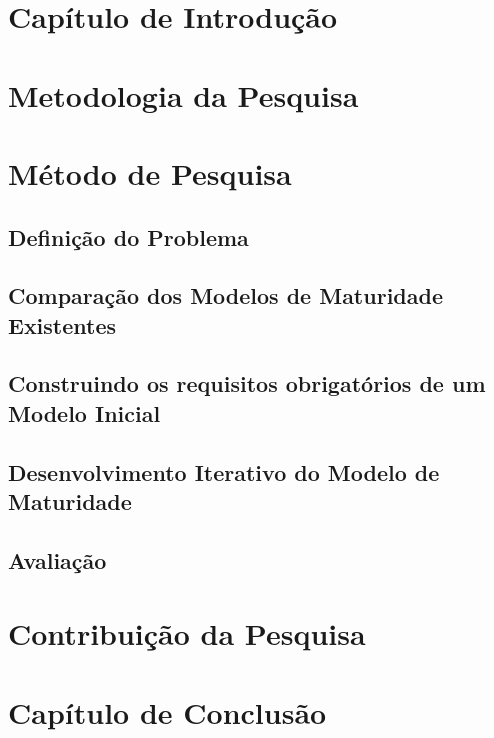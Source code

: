 \vspace{-2cm}

\section{Capítulo de Introdução}

\section{Metodologia da Pesquisa}

\section{Método de Pesquisa}

\subsection{Definição do Problema}

\subsection{Comparação dos Modelos de Maturidade Existentes}

\subsection{Construindo os requisitos obrigatórios de um Modelo Inicial}

\subsection{Desenvolvimento Iterativo do Modelo de Maturidade}

\subsection{Avaliação}

\section{Contribuição da Pesquisa}

\section{Capítulo de Conclusão}